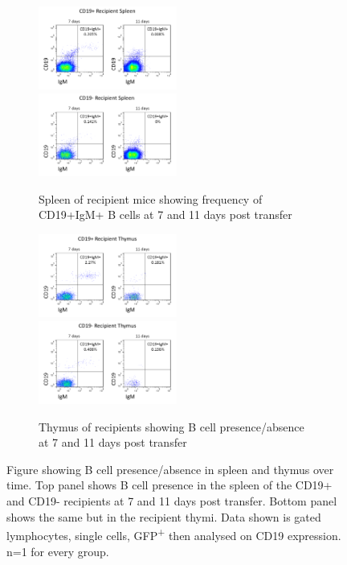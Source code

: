 \begin{figure}
	\begin{subfigure}{\textwidth}
	\includegraphics[width=0.5\textwidth]{Figures/CD19posrecipspleen.png}
	\includegraphics[width=0.5\textwidth]{Figures/CD19negrecipspleen.png}
	\caption{Spleen of recipient mice showing frequency of CD19+IgM+ B cells at 7 and 11 days post transfer}
	\end{subfigure}
	\begin{subfigure}{\textwidth}
	\includegraphics[width=0.5\textwidth]{Figures/CD19posrecipthy.png}
	\includegraphics[width=0.5\textwidth]{Figures/CD19negrecipthy.png}
	\caption{Thymus of recipients showing B cell presence/absence at 7 and 11 days post transfer}
	\end{subfigure}
\caption{Figure showing B cell presence/absence in spleen and thymus over time.
Top panel shows B cell presence in the spleen of the CD19+ and CD19- recipients at 7 and 11 days post transfer.
Bottom panel shows the same but in the recipient thymi.
Data shown is gated lymphocytes, single cells, GFP\textsuperscript{+} then analysed on CD19 expression.
n=1 for every group.}
\label{fig:Transfer}
\end{figure}

